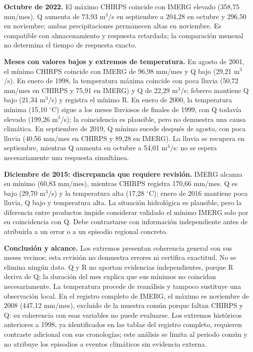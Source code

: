 \documentclass[10pt,a4paper]{article}
\begin{document}
\textbf{Octubre de 2022.} El máximo CHIRPS coincide con IMERG elevado (358,75 mm/mes). Q aumenta de 73,93 m$^3$/s en septiembre a 204,28 en octubre y 296,50 en noviembre; ambas precipitaciones permanecen altas en noviembre. Es compatible con almacenamiento y respuesta retardada; la comparación mensual no determina el tiempo de respuesta exacto.

\textbf{Meses con valores bajos y extremos de temperatura.} En agosto de 2001, el mínimo CHIRPS coincide con IMERG de 96,98 mm/mes y Q bajo (29,21 m$^3$/s). En enero de 1998, la temperatura máxima coincide con poca lluvia (50,72 mm/mes en CHIRPS y 75,91 en IMERG) y Q de 22,29 m$^3$/s; febrero mantiene Q bajo (21,34 m$^3$/s) y registra el mínimo R. En enero de 2000, la temperatura mínima (15,10 $^\circ$C) sigue a los meses lluviosos de finales de 1999, con Q todavía elevado (199,26 m$^3$/s); la coincidencia es plausible, pero no demuestra una causa climática. En septiembre de 2019, Q mínimo sucede después de agosto, con poca lluvia (40,56 mm/mes en CHIRPS y 89,28 en IMERG). La lluvia se recupera en septiembre, mientras Q aumenta en octubre a 54,01 m$^3$/s: no se espera necesariamente una respuesta simultánea.

\textbf{Diciembre de 2015: discrepancia que requiere revisión.} IMERG alcanza su mínimo (60,83 mm/mes), mientras CHIRPS registra 170,66 mm/mes. Q es bajo (29,70 m$^3$/s) y la temperatura alta (17,28 $^\circ$C); enero de 2016 mantiene poca lluvia, Q bajo y temperatura alta. La situación hidrológica es plausible, pero la diferencia entre productos impide considerar validado el mínimo IMERG solo por su coincidencia con Q. Debe contrastarse con información independiente antes de atribuirla a un error o a un episodio regional concreto.

\textbf{Conclusión y alcance.} Los extremos presentan coherencia general con sus meses vecinos; esta revisión no demuestra errores ni certifica exactitud. No se elimina ningún dato. Q y R no aportan evidencias independientes, porque R deriva de Q; la duración del mes explica que sus mínimos no coincidan necesariamente. La temperatura procede de reanálisis y tampoco sustituye una observación local. En el registro completo de IMERG, el máximo es noviembre de 2008 (447,12 mm/mes), excluido de la muestra común porque faltan CHIRPS y Q: su coherencia con esas variables no puede evaluarse. Los extremos históricos anteriores a 1998, ya identificados en las tablas del registro completo, requieren contraste adicional con sus cronologías; este análisis se limita al periodo común y no atribuye los episodios a eventos climáticos sin evidencia externa.
\end{document}
